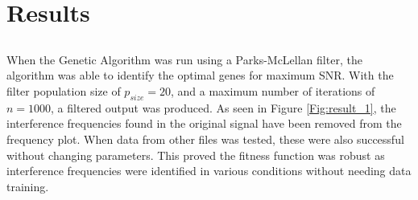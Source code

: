 \documentclass[a4paper, 11pt]{article}
\begin{document}
\section{Results}\label{sec:res}
    \subsection{}
    When the Genetic Algorithm was run using a Parks-McLellan filter, the algorithm was able to identify the optimal genes for 
    maximum SNR. With the filter population size of $p_{size} = 20$, and a maximum number of iterations of $n = 1000$, a filtered 
    output was produced. As seen in Figure \ref{Fig:result_1}, the interference frequencies found in the original signal have 
    been removed from the frequency plot. When data from other files was tested, these were also successful without changing 
    parameters. This proved the fitness function was robust as interference frequencies were identified in various conditions
    without needing data training. 
    
\end{document}
